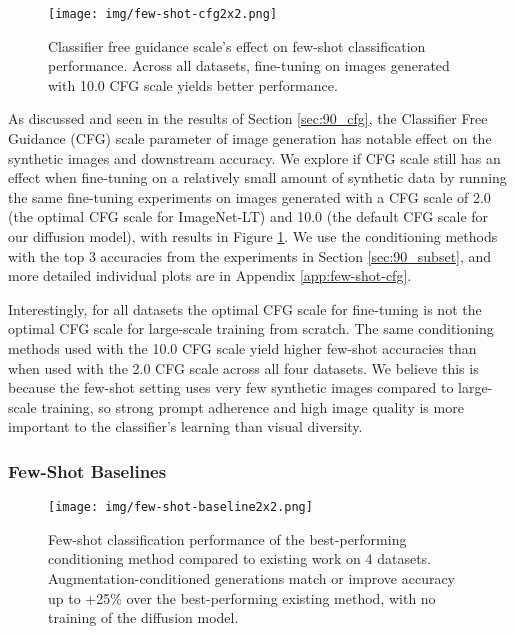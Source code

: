 \begin{figure}[t]
    \centering
    \texttt{[image: img/few-shot-cfg2x2.png]}
    \hspace{-0.2cm}
    \vspace{-0.5cm}
    \caption{Classifier free guidance scale's effect on few-shot classification performance. Across all datasets, fine-tuning on images generated with 10.0 CFG scale yields better performance.}
    \label{fig:few-shot-cfg} 
    \vspace{-0.5cm}
\end{figure}

As discussed and seen in the results of Section \ref{sec:90_cfg}, the Classifier Free Guidance (CFG) scale parameter of image generation has notable effect on the synthetic images and downstream accuracy. We explore if CFG scale still has an effect when fine-tuning on a relatively small amount of synthetic data by running the same fine-tuning experiments on images generated with a CFG scale of 2.0 (the optimal CFG scale for ImageNet-LT) and 10.0 (the default CFG scale for our diffusion model), with results in Figure \ref{fig:few-shot-cfg}. We use the conditioning methods with the top 3 accuracies from the experiments in Section \ref{sec:90_subset}, and more detailed individual plots are in Appendix \ref{app:few-shot-cfg}.

Interestingly, for all datasets the optimal CFG scale for fine-tuning is not the optimal CFG scale for large-scale training from scratch. The same conditioning methods used with the 10.0 CFG scale yield higher few-shot accuracies than when used with the 2.0 CFG scale across all four datasets. We believe this is because the few-shot setting uses very few synthetic images compared to large-scale training, so strong prompt adherence and high image quality is more important to the classifier's learning than visual diversity. 

\vspace{-0.15cm}
\subsubsection{Few-Shot Baselines}
\vspace{-0.15cm}

\begin{figure}[ht]
    \centering
    \texttt{[image: img/few-shot-baseline2x2.png]}
    \vspace{-0.25cm}
    \caption{Few-shot classification performance of the best-performing conditioning method compared to existing work on 4 datasets. Augmentation-conditioned generations match or improve accuracy up to +25\% over the best-performing existing method, with no training of the diffusion model.}
    \label{fig:few-shot-baseline}
    \vspace{-0.5cm}
\end{figure}

